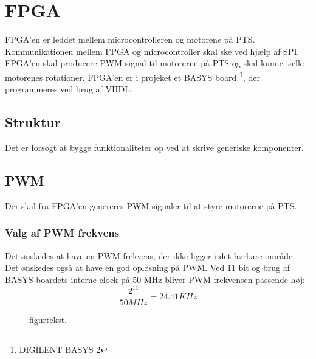 \section{FPGA}
\label{sec:FPGA}

FPGA'en er leddet mellem microcontrolleren og motorene på PTS. 
Kommunikationen mellem FPGA og microcontroller skal ske ved hjælp af SPI. 
FPGA'en skal producere PWM signal til motorerne på PTS og skal kunne tælle motorenes rotationer. 
FPGA'en er i projeket et BASYS board \footnote{DIGILENT BASYS 2}, der programmeres ved brug af VHDL.

\subsection{Struktur}
Det er forsøgt at bygge funktionaliteter op ved at skrive generiske komponenter. 

\subsection{PWM}
Der skal fra FPGA'en genereres PWM signaler til at styre motorerne på PTS.
\subsubsection*{Valg af PWM frekvens}
Det ønskedes at have en PWM frekvens, der ikke ligger i det hørbare område. 
Det ønskedes også at have en god opløsning på PWM. 
Ved 11 bit og brug af BASYS boardets interne clock på 50 MHz bliver PWM frekvensen passende høj:
\begin{equation}
  \frac{2^{11}}{50 MHz} = 24.41 KHz 
\end{equation}

\begin{figure}[!th]
\centering
\begin{tikzpicture}[node distance = 5 cm,scale=1]

\end{tikzpicture}
\caption[tekst i indholdsfortegnelsen]{figurtekst.}
\label{fig:FPGA_blok}
\end{figure}

